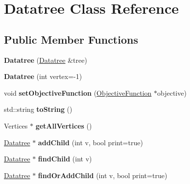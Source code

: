 \hypertarget{classDatatree}{\section{Datatree Class Reference}
\label{classDatatree}
}
\subsection*{Public Member Functions}
\begin{DoxyCompactItemize}
\item 
\hypertarget{classDatatree_a8bb93df8a3fa33b71a264fb43ff6d964}{{\bfseries Datatree} (\hyperlink{classDatatree}{Datatree} \&tree)}\label{classDatatree_a8bb93df8a3fa33b71a264fb43ff6d964}

\item 
\hypertarget{classDatatree_a2b48ff5bfeca69cf5040ed34a9e994a5}{{\bfseries Datatree} (int vertex=-\/1)}\label{classDatatree_a2b48ff5bfeca69cf5040ed34a9e994a5}

\item 
\hypertarget{classDatatree_a0616b4cf3d6250609f58513ea93527b3}{void {\bfseries set\-Objective\-Function} (\hyperlink{classObjectiveFunction}{Objective\-Function} $\ast$objective)}\label{classDatatree_a0616b4cf3d6250609f58513ea93527b3}

\item 
\hypertarget{classDatatree_a3dc05fe23b3fab23ec5a0b23fdaf4fa8}{std\-::string {\bfseries to\-String} ()}\label{classDatatree_a3dc05fe23b3fab23ec5a0b23fdaf4fa8}

\item 
\hypertarget{classDatatree_a026a5e0a90635ef9a6333bfca2f24443}{Vertices $\ast$ {\bfseries get\-All\-Vertices} ()}\label{classDatatree_a026a5e0a90635ef9a6333bfca2f24443}

\item 
\hypertarget{classDatatree_a182d9d69820f49e271f98bd16799ff0a}{\hyperlink{classDatatree}{Datatree} $\ast$ {\bfseries add\-Child} (int v, bool print=true)}\label{classDatatree_a182d9d69820f49e271f98bd16799ff0a}

\item 
\hypertarget{classDatatree_ab022efbacb970f0cf6a96a872330c473}{\hyperlink{classDatatree}{Datatree} $\ast$ {\bfseries find\-Child} (int v)}\label{classDatatree_ab022efbacb970f0cf6a96a872330c473}

\item 
\hypertarget{classDatatree_a5109102d0c4e0585c3479be1d691da3c}{\hyperlink{classDatatree}{Datatree} $\ast$ {\bfseries find\-Or\-Add\-Child} (int v, bool print=true)}\label{classDatatree_a5109102d0c4e0585c3479be1d691da3c}


\end{DoxyCompactItemize}
